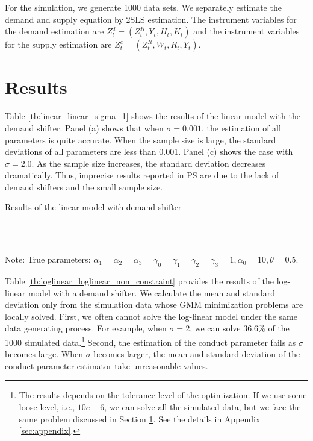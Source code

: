 \documentclass[11pt, a4paper]{article}
\begin{document}
For the simulation, we generate 1000 data sets.
We separately estimate the demand and supply equation by 2SLS estimation.
The instrument variables for the demand estimation are $Z^{d}_{t} = (Z^{R}_{t}, Y_t, H_{t}, K_{t})$ and the instrument variables for the supply estimation are $Z^{c}_{t} = (Z^{R}_{t}, W_{t}, R_t, Y_t)$. 


\section{Results}\label{sec:results}

Table \ref{tb:linear_linear_sigma_1} shows the results of the linear model with the demand shifter.
Panel (a) shows that when $\sigma = 0.001$, the estimation of all parameters is quite accurate.
When the sample size is large, the standard deviations of all parameters are less than 0.001. 
Panel (c) shows the case with $\sigma = 2.0$. As the sample size increases, the standard deviation decreases dramatically. 
Thus, imprecise results reported in PS are due to the lack of demand shifters and the small sample size.



\begin{table}[!htbp]
  \begin{center}
      \caption{Results of the linear model with demand shifter}
      \label{tb:linear_linear_sigma_1} 
      \subfloat[$\sigma=0.001$]{}\\
      \subfloat[$\sigma=0.5$]{}\\
    \subfloat[$\sigma=2.0$]{}
  \end{center}\footnotesize
  Note: True parameters: $\alpha_1 = \alpha_2 = \alpha_3 = \gamma_0 = \gamma_1 = \gamma_2  = \gamma_3 = 1, \alpha_0 = 10, \theta = 0.5.$
\end{table} 

Table \ref{tb:loglinear_loglinear_non_constraint} provides the results of the log-linear model with a demand shifter.
We calculate the mean and standard deviation only from the simulation data whose GMM minimization problems are locally solved. 
First, we often cannot solve the log-linear model under the same data generating process. For example, when $\sigma=2$, we can solve 36.6\% of the 1000 simulated data.\footnote{The results depends on the tolerance level of the optimization. If we use some loose level, i.e., $10e-6$, we can solve all the simulated data, but we face the same problem discussed in Section \ref{sec:results}. See the details in Appendix \ref{sec:appendix}.}
Second, the estimation of the conduct parameter fails as $\sigma$ becomes large. 
When $\sigma$ becomes larger, the mean and standard deviation of the conduct parameter estimator take unreasonable values.
\end{document}
